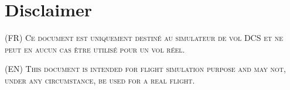 \thispagestyle{default}


\section*{Disclaimer}
{}

\vfill

{\Huge%

    \begin{doublespacing}%
        \textsc{(FR) Ce document est uniquement destiné au simulateur de vol DCS et ne peut en aucun cas être utilisé pour un vol réel.}%
    \end{doublespacing}%
    
\vspace{4cm}

    \begin{doublespacing}%
        \textsc{(EN) This document is intended for flight simulation purpose and may not, under any circumstance, be used for a real flight.}%
    \end{doublespacing}%

}

\vfill

